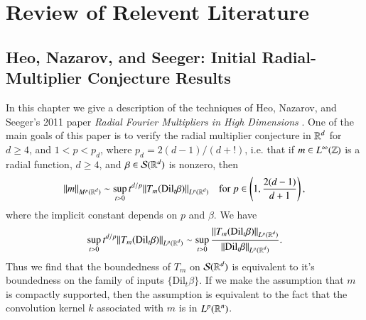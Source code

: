 
















\part{Review of Relevent Literature}

\chapter[HNS: Initial Radial-Multiplier Conjecture Bounds]{Heo, Nazarov, and Seeger: Initial Radial-Multiplier Conjecture Results} \label{HeoNazarovSeeger}

In this chapter we give a description of the techniques of Heo, Nazarov, and Seeger's 2011 paper \emph{Radial Fourier Multipliers in High Dimensions} \cite{HeoandNazarovandSeeger}. One of the main goals of this paper is to verify the radial multiplier conjecture in $\operatorname{\mathbb{R}}^d$ for $d \geq 4$, and $1 < p < p_d$, where $p_d = 2(d-1)/(d+!)$, i.e. that if $m \in L^\infty(\operatorname{\mathbb{Z}})$ is a radial function, $d \geq 4$, and $\beta \in \mathcal{S}(\operatorname{\mathbb{R}}^d)$ is nonzero, then
%
\[ \| m \|_{M^p(\operatorname{\mathbb{R}}^d)} \sim \sup_{t > 0} t^{d/p} \| T_m(\text{Dil}_t \beta) \|_{L^p(\operatorname{\mathbb{R}}^d)} \quad \text{for}\ p \in \left(1, \frac{2(d-1)}{d+1} \right), \]
%
where the implicit constant depends on $p$ and $\beta$. We have
%
\[ \sup_{t > 0} t^{d/p} \| T_m(\text{Dil}_t \beta) \|_{L^p(\operatorname{\mathbb{R}}^d)} \sim \sup_{t > 0} \frac{\| T_m(\text{Dil}_t \beta) \|_{L^p(\operatorname{\mathbb{R}}^d)}}{\| \text{Dil}_t \beta \|_{L^p(\operatorname{\mathbb{R}}^d)}}. \]
%
Thus we find that the boundedness of $T_m$ on $\mathcal{S}(\operatorname{\mathbb{R}}^d)$ is equivalent to it's boundedness on the family of inputs $\{ \text{Dil}_t \beta \}$. If we make the assumption that $m$ is compactly supported, then the assumption is equivalent to the fact that the convolution kernel $k$ associated with $m$ is in $L^p(\operatorname{\mathbb{R}}^n)$.

